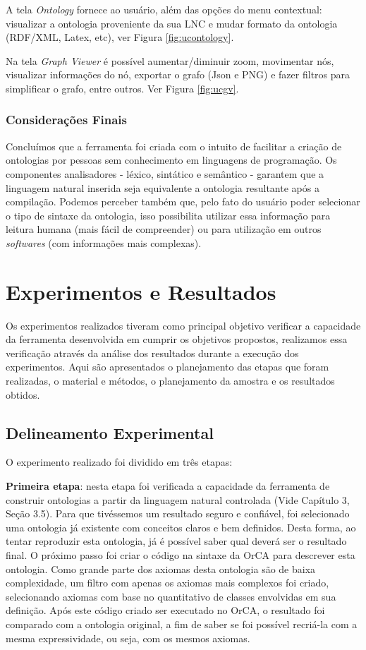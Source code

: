 \documentclass{bcc}
\begin{document}
A tela \textit{Ontology} fornece ao usuário, além das opções do menu contextual: visualizar a ontologia proveniente da sua LNC e mudar formato da ontologia (RDF/XML, Latex, etc), ver Figura \ref{fig:ucontology}.

Na tela \textit{Graph Viewer} é possível aumentar/diminuir zoom, movimentar nós, visualizar informações do nó, exportar o grafo (Json e PNG) e fazer filtros para simplificar o grafo, entre outros. Ver Figura \ref{fig:ucgv}.


\subsection{Considerações Finais}
Concluímos que a ferramenta foi criada com o intuito de facilitar a criação de ontologias por pessoas sem conhecimento em linguagens de programação. Os componentes analisadores - léxico, sintático e semântico - garantem que a linguagem natural inserida seja equivalente a ontologia resultante após a compilação. Podemos perceber também que, pelo fato do usuário poder selecionar o tipo de sintaxe da ontologia, isso possibilita utilizar essa informação para leitura humana (mais fácil de compreender) ou para utilização em outros \textit{softwares} (com informações mais complexas).


\chapter{Experimentos e Resultados}
\label{chap:exp}

Os experimentos realizados tiveram como principal objetivo verificar a capacidade da ferramenta desenvolvida em cumprir os objetivos propostos, realizamos essa verificação através da análise dos resultados durante a execução dos experimentos. Aqui são apresentados o planejamento das etapas que foram realizadas, o material e métodos, o planejamento da amostra e os resultados obtidos.


\section{Delineamento Experimental}
O experimento realizado foi dividido em três etapas: 

\textbf{Primeira etapa}: nesta etapa foi verificada a capacidade da ferramenta de construir ontologias a partir da linguagem natural controlada (Vide Capítulo 3, Seção 3.5). Para que tivéssemos um resultado seguro e confiável, foi selecionado uma ontologia já existente com conceitos claros e bem definidos. Desta forma, ao tentar reproduzir esta ontologia, já é possível saber qual deverá ser o resultado final. O próximo passo foi criar o código na sintaxe da OrCA para descrever esta ontologia. Como grande parte dos axiomas desta ontologia são de baixa complexidade, um filtro com apenas os axiomas mais complexos foi criado, selecionando axiomas com base no quantitativo de classes envolvidas em sua definição. Após este código criado ser executado no OrCA, o resultado foi comparado com a ontologia original, a fim de saber se foi possível recriá-la com a mesma expressividade, ou seja, com os mesmos axiomas.
\end{document}

